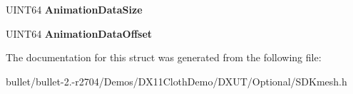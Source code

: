 \begin{DoxyCompactItemize}
\item 
\hypertarget{struct_s_d_k_a_n_i_m_a_t_i_o_n___f_i_l_e___h_e_a_d_e_r_a3b5165c9ea1bc506f2c7bcfab7f830bf}{U\+I\+N\+T64 {\bfseries Animation\+Data\+Size}}\label{struct_s_d_k_a_n_i_m_a_t_i_o_n___f_i_l_e___h_e_a_d_e_r_a3b5165c9ea1bc506f2c7bcfab7f830bf}

\item 
\hypertarget{struct_s_d_k_a_n_i_m_a_t_i_o_n___f_i_l_e___h_e_a_d_e_r_a080dcdee4b94ec94f405e7888869891b}{U\+I\+N\+T64 {\bfseries Animation\+Data\+Offset}}\label{struct_s_d_k_a_n_i_m_a_t_i_o_n___f_i_l_e___h_e_a_d_e_r_a080dcdee4b94ec94f405e7888869891b}

\end{DoxyCompactItemize}


The documentation for this struct was generated from the following file\+:\begin{DoxyCompactItemize}
\item 
bullet/bullet-\/2.-\/r2704/\+Demos/\+D\+X11\+Cloth\+Demo/\+D\+X\+U\+T/\+Optional/S\+D\+Kmesh.\+h\end{DoxyCompactItemize}
